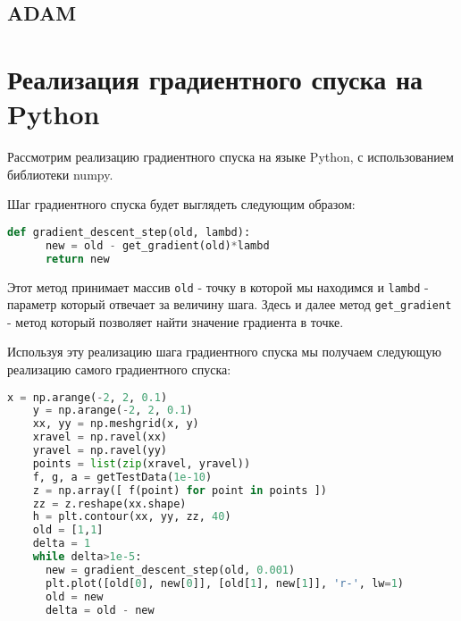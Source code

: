 \documentclass[12pt]{report}
\begin{document}
  \section{ADAM}

  \chapter{Реализация градиентного спуска на Python}
  Рассмотрим реализацию градиентного спуска на языке Python, с использованием
  библиотеки numpy.

  Шаг градиентного спуска будет выглядеть следующим образом:

  \begin{lstlisting}[language=Python, frame=single]
    def gradient_descent_step(old, lambd):
      new = old - get_gradient(old)*lambd
      return new
  \end{lstlisting}

  Этот метод принимает массив \verb|old| - точку в которой мы находимся и
  \verb|lambd| - параметр который отвечает за величину шага. Здесь и далее метод
  \verb|get_gradient| - метод который позволяет найти значение градиента в точке.

  Используя эту реализацию шага градиентного спуска мы получаем следующую
  реализацию самого градиентного спуска:

  \begin{lstlisting}[language=Python, frame=single]
    x = np.arange(-2, 2, 0.1)
    y = np.arange(-2, 2, 0.1)
    xx, yy = np.meshgrid(x, y)
    xravel = np.ravel(xx)
    yravel = np.ravel(yy)
    points = list(zip(xravel, yravel))
    f, g, a = getTestData(1e-10)
    z = np.array([ f(point) for point in points ])
    zz = z.reshape(xx.shape)
    h = plt.contour(xx, yy, zz, 40)
    old = [1,1]
    delta = 1
    while delta>1e-5:
      new = gradient_descent_step(old, 0.001)
      plt.plot([old[0], new[0]], [old[1], new[1]], 'r-', lw=1)
      old = new
      delta = old - new
  \end{lstlisting}
\end{document}
